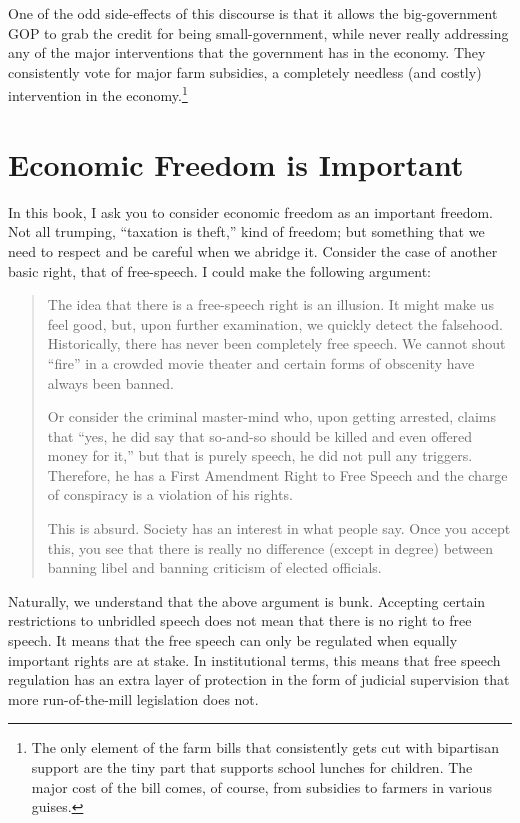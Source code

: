 One of the odd side-effects of this discourse is that it allows the
big-government GOP to grab the credit for being small-government, while never
really addressing any of the major interventions that the government has in the
economy. They consistently vote for major farm subsidies, a completely needless
(and costly) intervention in the economy.\footnote{The only element of the farm
bills that consistently gets cut with bipartisan support are the tiny part that
supports school lunches for children. The major cost of the bill comes, of
course, from subsidies to farmers in various guises.} %


\section{Economic Freedom is Important}

In this book, I ask you to consider economic freedom as an important freedom.
Not all trumping, ``taxation is theft,'' kind of freedom; but something that we
need to respect and be careful when we abridge it. Consider the case of another
basic right, that of free-speech. I could make the following argument:

\begin{quote}
The idea that there is a free-speech right is an illusion. It might make us
feel good, but, upon further examination, we quickly detect the falsehood.
Historically, there has never been completely free speech. We cannot shout
``fire'' in a crowded movie theater and certain forms of obscenity have always
been banned.

Or consider the criminal master-mind who, upon getting arrested, claims that
``yes, he did say that so-and-so should be killed and even offered money for
it,'' but that is purely speech, he did not pull any triggers. Therefore, he
has a First Amendment Right to Free Speech and the charge of conspiracy is a
violation of his rights.

This is absurd. Society has an interest in what people say. Once you accept
this, you see that there is really no difference (except in degree) between
banning libel and banning criticism of elected officials.
\end{quote}

Naturally, we understand that the above argument is bunk. Accepting certain
restrictions to unbridled speech does not mean that there is no right to free
speech. It means that the free speech can only be regulated when equally
important rights are at stake. In institutional terms, this means that free
speech regulation has an extra layer of protection in the form of judicial
supervision that more run-of-the-mill legislation does not.

